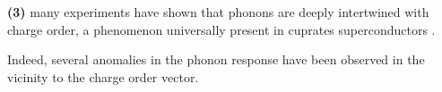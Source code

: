 \documentclass[11pt]{article}
\begin{document}
\textbf{(3)} many experiments have shown that phonons are deeply intertwined with charge order, a phenomenon universally present in cuprates superconductors \cite{arpaia_charge_2021,comin_resonant_2016,canosa_resonant_2014, hucker_competing_2014, chang_direct_2012,ghiringhelli_long-range_2012,wang_charge_2021,lin_strongly_2020, huang_quantum_2021,miao_incommensurate_2018,tacon_inelastic_2014,li_multiorbital_2020,braicovich_determining_2020,chaix_dispersive_2017,peng_enhanced_2020}. 

Indeed, several anomalies in the phonon response have been observed in the vicinity to the charge order vector.
%
\end{document}
